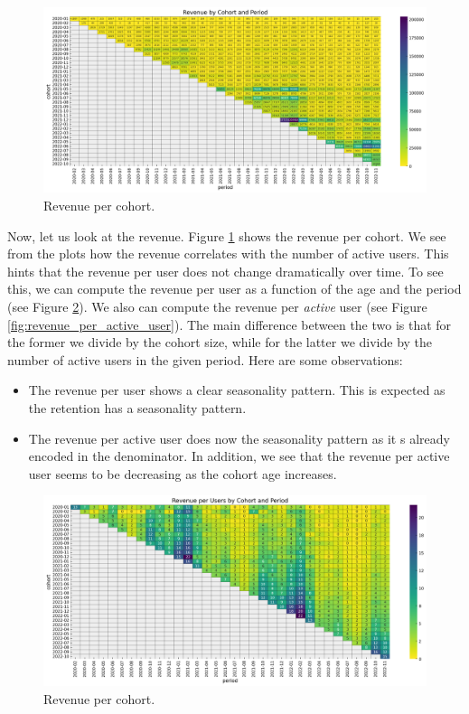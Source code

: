 \documentclass[11pt]{amsart}
\theoremstyle{definition}
\begin{document}
\begin{figure}
    \centering
    \includegraphics[width=\textwidth]{images/revenue_retention_23_0.png}
    \caption{Revenue per cohort.}
    \label{fig:revenue}
\end{figure}

Now, let us look at the revenue. Figure \ref{fig:revenue} shows the revenue per cohort. 
We see from the plots how the revenue correlates with the number of active users. This 
hints that the revenue per user does not change dramatically over time. To see this,
we can compute the revenue per user as a function of the age and the period (see Figure
\ref{fig:revenue_per_user}). We also can compute the revenue per {\em active} user (see
Figure \ref{fig:revenue_per_active_user}). The main difference between the two is that
for the former we divide by the cohort size, while for the latter we divide by the
number of active users in the given period. Here are some observations:

\begin{itemize}
    \item The revenue per user shows a clear seasonality pattern. This is expected as
        the retention has a seasonality pattern.
    \item The revenue per active user does now the seasonality pattern as it s already
        encoded in the denominator. In addition, we see that the revenue per active user
        seems to be decreasing as the cohort age increases.
\end{itemize}

\begin{figure}
    \centering
    \includegraphics[width=\textwidth]{images/revenue_retention_27_0.png}
    \caption{Revenue per cohort.}
    \label{fig:revenue_per_user}
\end{figure}
\end{document}
